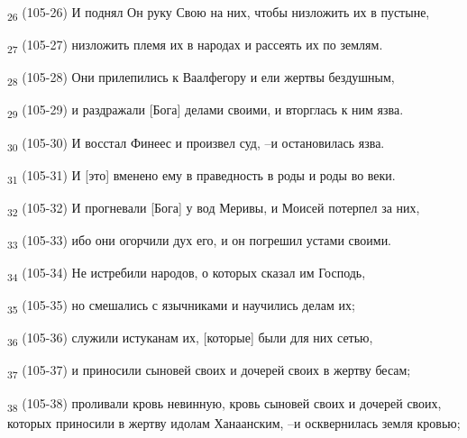 \begin{tcolorbox}
\textsubscript{26} (105-26) И поднял Он руку Свою на них, чтобы низложить их в пустыне,
\end{tcolorbox}
\begin{tcolorbox}
\textsubscript{27} (105-27) низложить племя их в народах и рассеять их по землям.
\end{tcolorbox}
\begin{tcolorbox}
\textsubscript{28} (105-28) Они прилепились к Ваалфегору и ели жертвы бездушным,
\end{tcolorbox}
\begin{tcolorbox}
\textsubscript{29} (105-29) и раздражали [Бога] делами своими, и вторглась к ним язва.
\end{tcolorbox}
\begin{tcolorbox}
\textsubscript{30} (105-30) И восстал Финеес и произвел суд, --и остановилась язва.
\end{tcolorbox}
\begin{tcolorbox}
\textsubscript{31} (105-31) И [это] вменено ему в праведность в роды и роды во веки.
\end{tcolorbox}
\begin{tcolorbox}
\textsubscript{32} (105-32) И прогневали [Бога] у вод Меривы, и Моисей потерпел за них,
\end{tcolorbox}
\begin{tcolorbox}
\textsubscript{33} (105-33) ибо они огорчили дух его, и он погрешил устами своими.
\end{tcolorbox}
\begin{tcolorbox}
\textsubscript{34} (105-34) Не истребили народов, о которых сказал им Господь,
\end{tcolorbox}
\begin{tcolorbox}
\textsubscript{35} (105-35) но смешались с язычниками и научились делам их;
\end{tcolorbox}
\begin{tcolorbox}
\textsubscript{36} (105-36) служили истуканам их, [которые] были для них сетью,
\end{tcolorbox}
\begin{tcolorbox}
\textsubscript{37} (105-37) и приносили сыновей своих и дочерей своих в жертву бесам;
\end{tcolorbox}
\begin{tcolorbox}
\textsubscript{38} (105-38) проливали кровь невинную, кровь сыновей своих и дочерей своих, которых приносили в жертву идолам Ханаанским, --и осквернилась земля кровью;
\end{tcolorbox}
